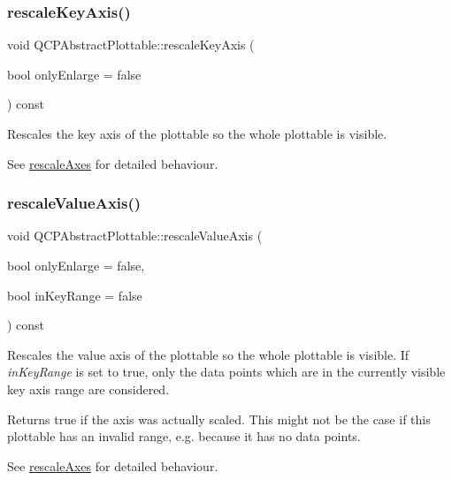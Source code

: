 \subsubsection{\texorpdfstring{rescale\+Key\+Axis()}{rescaleKeyAxis()}}
{\footnotesize\ttfamily void Q\+C\+P\+Abstract\+Plottable\+::rescale\+Key\+Axis (\begin{DoxyParamCaption}\item[{bool}]{only\+Enlarge = {\ttfamily false} }\end{DoxyParamCaption}) const}

Rescales the key axis of the plottable so the whole plottable is visible.

See \hyperlink{class_q_c_p_abstract_plottable_a1491c4a606bccd2d09e65e11b79eb882}{rescale\+Axes} for detailed behaviour. \mbox{\label{class_q_c_p_abstract_plottable_a714eaf36b12434cd71846215504db82e}} 
\subsubsection{\texorpdfstring{rescale\+Value\+Axis()}{rescaleValueAxis()}}
{\footnotesize\ttfamily void Q\+C\+P\+Abstract\+Plottable\+::rescale\+Value\+Axis (\begin{DoxyParamCaption}\item[{bool}]{only\+Enlarge = {\ttfamily false},  }\item[{bool}]{in\+Key\+Range = {\ttfamily false} }\end{DoxyParamCaption}) const}

Rescales the value axis of the plottable so the whole plottable is visible. If {\itshape in\+Key\+Range} is set to true, only the data points which are in the currently visible key axis range are considered.

Returns true if the axis was actually scaled. This might not be the case if this plottable has an invalid range, e.\+g. because it has no data points.

See \hyperlink{class_q_c_p_abstract_plottable_a1491c4a606bccd2d09e65e11b79eb882}{rescale\+Axes} for detailed behaviour. \mbox{\label{class_q_c_p_abstract_plottable_a663b1a44123c8340ac041a29d1e2c973}} 
